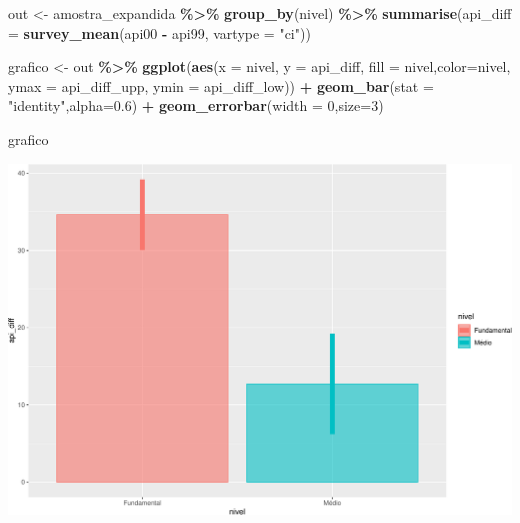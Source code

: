 \documentclass[
  9pt,
  ignorenonframetext,
]{beamer}
\newenvironment{Shaded}{\begin{snugshade}}{\end{snugshade}}
\newcommand{\DataTypeTok}[1]{\textcolor[rgb]{0.13,0.29,0.53}{#1}}
\newcommand{\DecValTok}[1]{\textcolor[rgb]{0.00,0.00,0.81}{#1}}
\newcommand{\FloatTok}[1]{\textcolor[rgb]{0.00,0.00,0.81}{#1}}
\newcommand{\KeywordTok}[1]{\textcolor[rgb]{0.13,0.29,0.53}{\textbf{#1}}}
\newcommand{\NormalTok}[1]{#1}
\newcommand{\OperatorTok}[1]{\textcolor[rgb]{0.81,0.36,0.00}{\textbf{#1}}}
\newcommand{\StringTok}[1]{\textcolor[rgb]{0.31,0.60,0.02}{#1}}
\begin{document}
\begin{frame}[fragile]{}
\protect\hypertarget{section-2}{}
\begin{Shaded}
\begin{Highlighting}[]
\NormalTok{out \textless{}{-}}\StringTok{ }\NormalTok{amostra\_expandida }\OperatorTok{\%\textgreater{}\%}
\StringTok{  }\KeywordTok{group\_by}\NormalTok{(nivel) }\OperatorTok{\%\textgreater{}\%}
\StringTok{  }\KeywordTok{summarise}\NormalTok{(}\DataTypeTok{api\_diff =} 
              \KeywordTok{survey\_mean}\NormalTok{(api00 }\OperatorTok{{-}}\StringTok{ }\NormalTok{api99, }\DataTypeTok{vartype =} \StringTok{"ci"}\NormalTok{))}
\end{Highlighting}
\end{Shaded}
\end{frame}

\begin{frame}[fragile]{}
\protect\hypertarget{section-3}{}
\begin{Shaded}
\begin{Highlighting}[]
\NormalTok{grafico \textless{}{-}}\StringTok{ }\NormalTok{out }\OperatorTok{\%\textgreater{}\%}\StringTok{ }
\StringTok{  }\KeywordTok{ggplot}\NormalTok{(}\KeywordTok{aes}\NormalTok{(}\DataTypeTok{x =}\NormalTok{ nivel, }\DataTypeTok{y =}\NormalTok{ api\_diff, }
             \DataTypeTok{fill =}\NormalTok{ nivel,}\DataTypeTok{color=}\NormalTok{nivel,}
                       \DataTypeTok{ymax =}\NormalTok{ api\_diff\_upp, }
             \DataTypeTok{ymin =}\NormalTok{ api\_diff\_low)) }\OperatorTok{+}
\StringTok{  }\KeywordTok{geom\_bar}\NormalTok{(}\DataTypeTok{stat =} \StringTok{"identity"}\NormalTok{,}\DataTypeTok{alpha=}\FloatTok{0.6}\NormalTok{) }\OperatorTok{+}
\StringTok{  }\KeywordTok{geom\_errorbar}\NormalTok{(}\DataTypeTok{width =} \DecValTok{0}\NormalTok{,}\DataTypeTok{size=}\DecValTok{3}\NormalTok{) }
\end{Highlighting}
\end{Shaded}
\end{frame}

\begin{frame}[fragile]{}
\protect\hypertarget{section-4}{}
\begin{Shaded}
\begin{Highlighting}[]
\NormalTok{grafico}
\end{Highlighting}
\end{Shaded}

\includegraphics{aula_05_files/figure-beamer/unnamed-chunk-7-1.pdf}
\end{frame}
\end{document}
